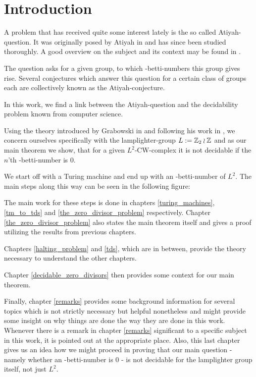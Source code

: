 \section{Introduction}

A problem that has received quite some interest lately is the so called Atiyah-question.
It was originally posed by Atiyah in \cite{ati76} and has since been studied thoroughly.
A good overview on the subject and its context may be found in \cite{luc02}.

The question asks for a given group, to which \ltwo-betti-numbers this group gives rise.
Several conjectures which answer this question for a certain class of groups each are collectively known as the Atiyah-conjecture.

In this work, we find a link between the Atiyah-question and the decidability problem known from computer science.

Using the theory introduced by Grabowski in \cite{gra14} and following his work in \cite{gra14-2}, we concern ourselves specifically with the lamplighter-group $L := \mathbb{Z}_2 \wr \mathbb{Z}$ and as our main theorem we show, that for a given $L^2$-CW-complex it is not decidable if the $n$'th \ltwo-betti-number is $0$.

We start off with a Turing machine and end up with an \ltwo-betti-number of $L^2$.
The main steps along this way can be seen in the following figure:
\begin{figure}[H]
	\centering
	
\end{figure}
The main work for these steps is done in chapters \ref{turing_machines}, \ref{tm_to_tds} and \ref{the_zero_divisor_problem} respectively.
Chapter \ref{the_zero_divisor_problem} also states the main theorem itself and gives a proof utilizing the results from previous chapters.

Chapters \ref{halting_problem} and \ref{tds}, which are in between, provide the theory necessary to understand the other chapters.

Chapter \ref{decidable_zero_divisors} then provides some context for our main theorem.

Finally, chapter \ref{remarks} provides some background information for several topics which is not strictly necessary but helpful nonetheless and might provide some insight on why things are done the way they are done in this work.
Whenever there is a remark in chapter \ref{remarks} significant to a specific subject in this work, it is pointed out at the appropriate place.
Also, this last chapter gives us an idea how we might proceed in proving that our main question - namely whether an \ltwo-betti-number is $0$ - is not decidable for the lamplighter group itself, not just $L^2$.

